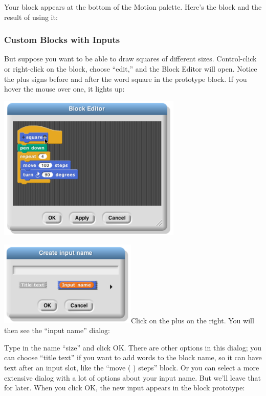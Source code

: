 Your block appears at the bottom of the Motion palette. Here's the block
and the result of using it:

\subsubsection{\texorpdfstring{\hfill\break
Custom Blocks with
Inputs}{ Custom Blocks with Inputs}}\label{custom-blocks-with-inputs}

But suppose you want to be able to draw squares of different sizes.
Control-click or right-click on the block, choose ``edit,'' and the
Block Editor will open. Notice the plus signs before and after the word
square in the prototype block. If you hover the mouse over one, it
lights up:

\includegraphics[width=3.44444in,height=2.72222in]{media/image508.png}

\includegraphics[width=2.58333in,height=1.60417in]{media/image509.png}Click
on the plus on the right. You will then see the ``input name'' dialog:

Type in the name ``size'' and click OK. There are other options in this
dialog; you can choose ``title text'' if you want to add words to the
block name, so it can have text after an input slot, like the ``move ( )
steps'' block. Or you can select a more extensive dialog with a lot of
options about your input name. But we'll leave that for later. When you
click OK, the new input appears in the block prototype:

